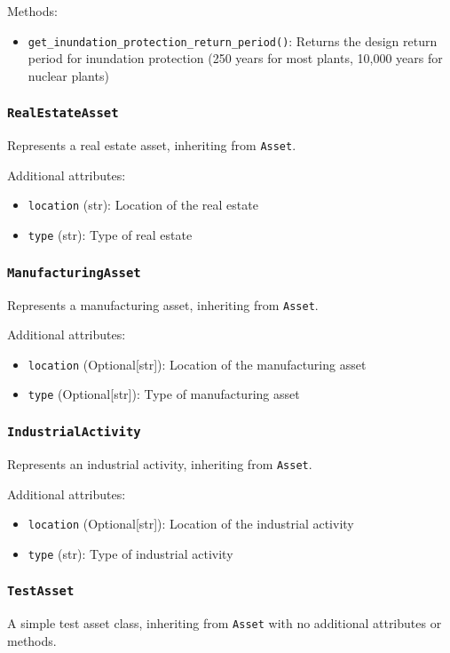 \documentclass{article}
\begin{document}
Methods:
\begin{itemize}
    \item \texttt{get\_inundation\_protection\_return\_period()}: Returns the design return period for inundation protection (250 years for most plants, 10,000 years for nuclear plants)
\end{itemize}

\subsubsection{\texttt{RealEstateAsset}}
Represents a real estate asset, inheriting from \texttt{Asset}.

Additional attributes:
\begin{itemize}
    \item \texttt{location} (str): Location of the real estate
    \item \texttt{type} (str): Type of real estate
\end{itemize}

\subsubsection{\texttt{ManufacturingAsset}}
Represents a manufacturing asset, inheriting from \texttt{Asset}.

Additional attributes:
\begin{itemize}
    \item \texttt{location} (Optional[str]): Location of the manufacturing asset
    \item \texttt{type} (Optional[str]): Type of manufacturing asset
\end{itemize}

\subsubsection{\texttt{IndustrialActivity}}
Represents an industrial activity, inheriting from \texttt{Asset}.

Additional attributes:
\begin{itemize}
    \item \texttt{location} (Optional[str]): Location of the industrial activity
    \item \texttt{type} (str): Type of industrial activity
\end{itemize}

\subsubsection{\texttt{TestAsset}}
A simple test asset class, inheriting from \texttt{Asset} with no additional attributes or methods.
\end{document}
